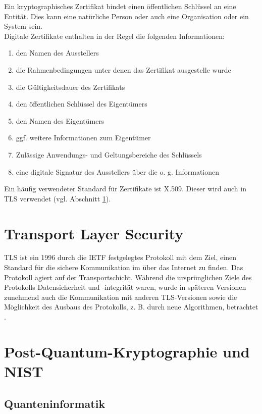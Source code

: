 		Ein kryptographisches Zertifikat bindet einen öffentlichen Schlüssel an eine Entität. Dies kann eine natürliche Person oder auch eine Organisation oder ein System sein.\\
		
		Digitale Zertifikate enthalten in der Regel die folgenden Informationen:
		
		\begin{enumerate}
			\item den Namen des Ausstellers
			\item die Rahmenbedingungen unter denen das Zertifikat ausgestelle wurde
			\item die Gültigkeitsdauer des Zertifikats
			\item den öffentlichen Schlüssel des Eigentümers
			\item den Namen des Eigentümers
			\item ggf. weitere Informationen zum Eigentümer
			\item Zulässige Anwendungs- und Geltungsbereiche des Schlüssels
			\item eine digitale Signatur des Ausstellers über die o. g. Informationen
		\end{enumerate}
	
		Ein häufig verwendeter Standard für Zertifikate ist X.509. Dieser wird auch in TLS verwendet (vgl. Abschnitt \ref{sec:grundlagen:tls}).
	
	\section{Transport Layer Security}
	\label{sec:grundlagen:tls}
	
	TLS ist ein 1996 durch die \ac{IETF} festgelegtes Protokoll mit dem Ziel, einen Standard für die sichere Kommunikation im über das Internet zu finden. Das Protokoll agiert auf der Transportschicht. Während die ursprünglichen Ziele des Protokolls Datensicherheit und -integrität waren, wurde in späteren Versionen zunehmend auch die Kommunikation mit anderen TLS-Versionen sowie die Möglichkeit des Ausbaus des Protokolls, z. B. durch neue Algorithmen, betrachtet \cite{Kizza2020}.
	
	\section{Post-Quantum-Kryptographie und NIST}
	\label{sec:grundlagen:pqc}
	
		\subsection{Quanteninformatik}
		\label{subsec:grundlagen:pqc:quantencomputer}
	
